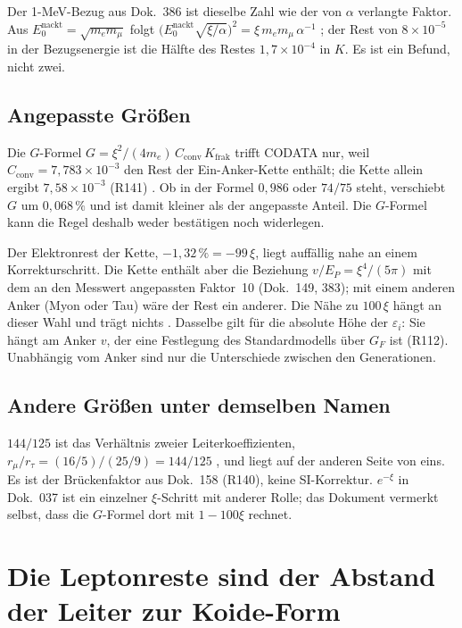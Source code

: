 Der 1-MeV-Bezug aus Dok.~386 ist dieselbe Zahl wie der von $\alpha$ verlangte Faktor. Aus
$E_0^{\text{nackt}}=\sqrt{m_em_\mu}$ folgt $\bigl(E_0^{\text{nackt}}\sqrt{\xi/\alpha}\bigr)^2=
\xi\,m_em_\mu\,\alpha^{-1}$ \BM; der Rest von $8\times10^{-5}$ in der Bezugsenergie ist die Hälfte
des Restes $1{,}7\times10^{-4}$ in $K$. Es ist ein Befund, nicht zwei.

\subsection{Angepasste Größen}

Die $G$-Formel $G=\xi^2/(4m_e)\,C_{\text{conv}}\,K_{\text{frak}}$ trifft CODATA nur, weil
$C_{\text{conv}}=7{,}783\times10^{-3}$ den Rest der Ein-Anker-Kette enthält; die Kette allein ergibt
$7{,}58\times10^{-3}$ (R141) \KM. Ob in der Formel $0{,}986$ oder $74/75$ steht, verschiebt $G$ um
$0{,}068\,\%$ und ist damit kleiner als der angepasste Anteil. Die $G$-Formel kann die Regel deshalb
weder bestätigen noch widerlegen.

Der Elektronrest der Kette, $-1{,}32\,\%=-99\,\xi$, liegt auffällig nahe an einem Korrekturschritt.
Die Kette enthält aber die Beziehung $v/E_P=\xi^4/(5\pi)$ mit dem an den Messwert angepassten
Faktor~10 (Dok.~149, 383); mit einem anderen Anker (Myon oder Tau) wäre der Rest ein anderer. Die
Nähe zu $100\,\xi$ hängt an dieser Wahl und trägt nichts \SM. Dasselbe gilt für die absolute Höhe der
$\varepsilon_i$: Sie hängt am Anker $v$, der eine Festlegung des Standardmodells über $G_F$ ist
(R112). Unabhängig vom Anker sind nur die Unterschiede zwischen den Generationen.

\subsection{Andere Größen unter demselben Namen}

$144/125$ ist das Verhältnis zweier Leiterkoeffizienten, $r_\mu/r_\tau=(16/5)/(25/9)=144/125$
\BM, und liegt auf der anderen Seite von eins. Es ist der Brückenfaktor aus Dok.~158 (R140), keine
SI-Korrektur. $e^{-\xi}$ in Dok.~037 ist ein einzelner $\xi$-Schritt mit anderer Rolle; das Dokument
vermerkt selbst, dass die $G$-Formel dort mit $1-100\xi$ rechnet.

\section{Die Leptonreste sind der Abstand der Leiter zur Koide-Form}

